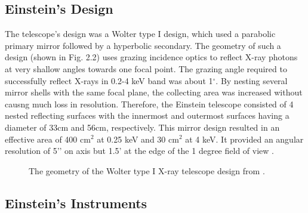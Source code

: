 \subsection{Einstein's Design}

The telescope’s design was a Wolter type I design, which used a parabolic primary mirror followed by a hyperbolic secondary. 
The geometry of such a design (shown in Fig. 2.2) uses grazing incidence optics to reflect X-ray photons at very shallow angles towards one focal point. 
The grazing angle required to successfully reflect X-rays in 0.2-4 keV band was about 1$^{\circ}$.
By nesting several mirror shells with the same focal plane, the collecting area was increased without causng much loss in resolution.
Therefore, the Einstein telescope consisted of 4 nested reflecting surfaces with the innermost and outermost surfaces having a diameter of 33cm and 56cm, respectively.
This mirror design resulted in an effective area of 400 cm$^2$ at 0.25 keV and 30 cm$^2$ at 4 keV. 
It provided an angular resolution of 5’’ on axis but 1.5’ at the edge of the 1 degree field of view \citep{giacconietal1979}.

\begin{figure}[H]
\centering
{}
\caption{The geometry of the Wolter type I X-ray telescope design from  \cite{giacconietal1979}. }
\label{imbeded_fb}
\end{figure}


\subsection{Einstein's Instruments}


